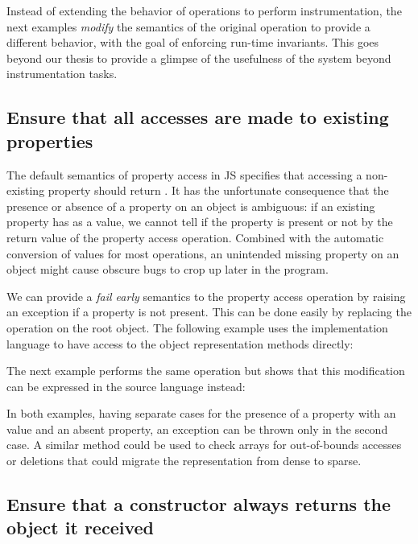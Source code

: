Instead of extending the behavior of operations to perform instrumentation, the
next examples \textit{modify} the semantics of the original operation to provide
a different behavior, with the goal of enforcing run-time invariants. This goes
beyond our thesis to provide a glimpse of the usefulness of the system beyond
instrumentation tasks.

\subsection{Ensure that all accesses are made to existing properties}

The default semantics of property access in JS specifies that accessing
a non-existing property should return . It has the unfortunate
consequence that the presence or absence of a property on an object is
ambiguous: if an existing property has  as a value, we cannot
tell if the property is present or not by the return value of the property
access operation. Combined with the automatic conversion of values for most
operations, an unintended missing property on an object might cause obscure
bugs to crop up later in the program.

We can provide a \textit{fail early} semantics to the property access operation
by raising an exception if a property is not present. This can be done easily
by replacing the  operation on the root object. The following
example uses the implementation language to have access to the object
representation methods directly:


The next example performs the same operation but shows that this modification 
can be expressed in the source language instead:


In both examples, having separate cases for the presence of a property with an
 value and an absent property, an exception can be thrown only in
the second case. A similar method could be used to check arrays for
out-of-bounds accesses or deletions that could migrate the representation from
dense to sparse.

\subsection{Ensure that a constructor always returns the object it received}

